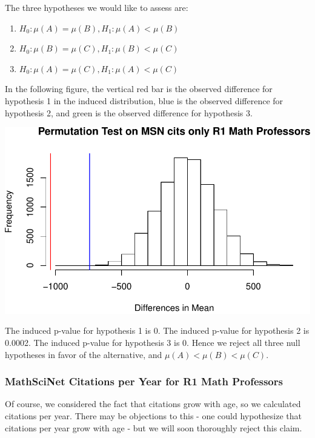 \documentclass[]{article}
\begin{document}
The three hypotheses we would like to assess are:

\begin{enumerate}
\def\labelenumi{\arabic{enumi}.}
\item
  \(H_0: \mu(A) = \mu(B), H_1: \mu(A) < \mu(B)\)
\item
  \(H_0: \mu(B) = \mu(C), H_1: \mu(B) < \mu(C)\)
\item
  \(H_0: \mu(A) = \mu(C), H_1: \mu(A) < \mu(C)\)
\end{enumerate}

In the following figure, the vertical red bar is the observed difference
for hypothesis 1 in the induced distribution, blue is the observed
difference for hypothesis 2, and green is the observed difference for
hypothesis 3.

\includegraphics{index_files/figure-latex/unnamed-chunk-12-1.pdf}

The induced p-value for hypothesis 1 is 0. The induced p-value for
hypothesis 2 is 0.0002. The induced p-value for hypothesis 3 is 0. Hence
we reject all three null hypotheses in favor of the alternative, and
\(\mu(A) < \mu(B) < \mu(C)\).

\hypertarget{mathscinet-citations-per-year-for-r1-math-professors}{%
\subsubsection{MathSciNet Citations per Year for R1 Math
Professors}\label{mathscinet-citations-per-year-for-r1-math-professors}}

Of course, we considered the fact that citations grow with age, so we
calculated citations per year. There may be objections to this - one
could hypothesize that citations per year grow with age - but we will
soon thoroughly reject this claim.
\end{document}
